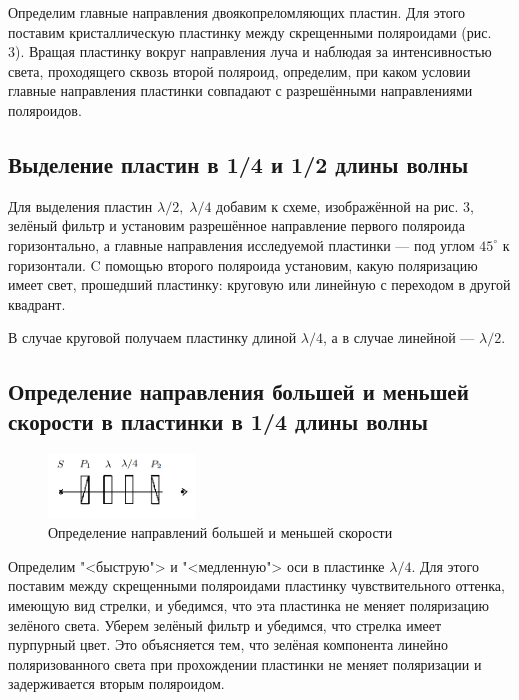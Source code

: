 \documentclass[a4paper]{article}
\begin{document}
\noindent Определим главные направления двоякопреломляющих пластин. Для этого поставим кристаллическую пластинку между скрещенными поляроидами (рис. 3). Вращая пластинку вокруг направления луча и наблюдая за интенсивностью света, проходящего сквозь второй поляроид, определим, при каком условии главные направления пластинки совпадают с разрешёнными направлениями поляроидов. 

\subsection{Выделение пластин в 1/4 и 1/2 длины волны}

\noindent Для выделения пластин $ \lambda/2, \; \lambda/4 $ добавим к схеме, изображённой на рис. 3, зелёный фильтр и установим разрешённое направление первого поляроида горизонтально, а главные направления исследуемой пластинки --- под углом $ 45^\circ $ к горизонтали. C помощью второго поляроида установим, какую поляризацию имеет свет, прошедший пластинку: круговую или линейную с переходом
в другой квадрант. \medskip

\noindent В случае круговой получаем пластинку длиной $ \lambda/4 $, а в случае линейной --- $ \lambda/2 $.

\subsection{Определение направления большей и меньшей скорости в пластинки в 1/4 длины волны}

\begin{figure}[ht!]
    \centering
    \includegraphics[width = 0.35\textwidth]{image/pic4.png}
    \caption{Определение направлений большей и меньшей скорости}
\end{figure}

\noindent Определим "<быструю"> и "<медленную"> оси в пластинке $ \lambda/4 $. Для этого поставим между скрещенными поляроидами пластинку чувствительного оттенка, имеющую вид стрелки, и убедимся, что эта пластинка не меняет поляризацию зелёного света. Уберем зелёный фильтр и убедимся, что стрелка имеет пурпурный цвет. Это объясняется тем, что зелёная компонента линейно поляризованного света при прохождении пластинки не меняет поляризации и задерживается вторым поляроидом. \medskip
\end{document}
